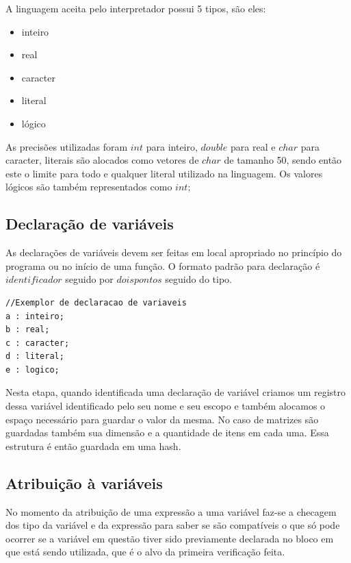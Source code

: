 \documentclass[a4paper,12pt]{report}
\begin{document}
A linguagem aceita pelo interpretador possui 5 tipos, s\~ao eles:

\begin{itemize}
	\item inteiro
    \item real
    \item caracter
    \item literal
    \item l\'ogico
\end{itemize}

As precis\~oes utilizadas foram $int$ para inteiro, $double$ para real e $char$ para caracter,
literais são alocados como vetores de $char$ de tamanho 50, sendo ent\~ao este o limite para 
todo e qualquer literal utilizado na linguagem. Os valores l\'ogicos s\~ao tamb\'em 
representados como $int$;

\subsection{Declara\c{c}\~ao de vari\'aveis}

As declara\c{c}\~oes de vari\'aveis devem ser feitas em local apropriado no princ\'ipio do 
programa ou no in\'icio de uma fun\c{c}\~ao. O formato padr\~ao para declara\c{c}\~ao \'e $identificador$ seguido por $dois pontos$ seguido do tipo.

\begin{verbatim}
//Exemplor de declaracao de variaveis
a : inteiro;
b : real;
c : caracter;
d : literal;
e : logico;
\end{verbatim}

Nesta etapa, quando identificada uma declara\c{c}\~ao de vari\'avel criamos um registro dessa vari\'avel identificado pelo seu nome e seu escopo e tamb\'em alocamos o espa\c{c}o necess\'ario para guardar o valor da mesma. No caso de matrizes s\~ao guardadas tamb\'em sua dimens\~ao e a quantidade de itens em cada uma. Essa estrutura \'e ent\~ao guardada em uma hash.

\subsection{Atribui\c{c}\~ao \`a vari\'aveis}

No momento da atribui\c{c}\~ao de uma express\~ao a uma vari\'avel faz-se a checagem dos tipo 
da vari\'avel e da express\~ao para saber se s\~ao compat\'iveis o que s\'o pode ocorrer se a 
vari\'avel em quest\~ao tiver sido previamente declarada no bloco em que est\'a sendo 
utilizada, que \'e o alvo da primeira verifica\c{c}\~ao feita.
\end{document}

